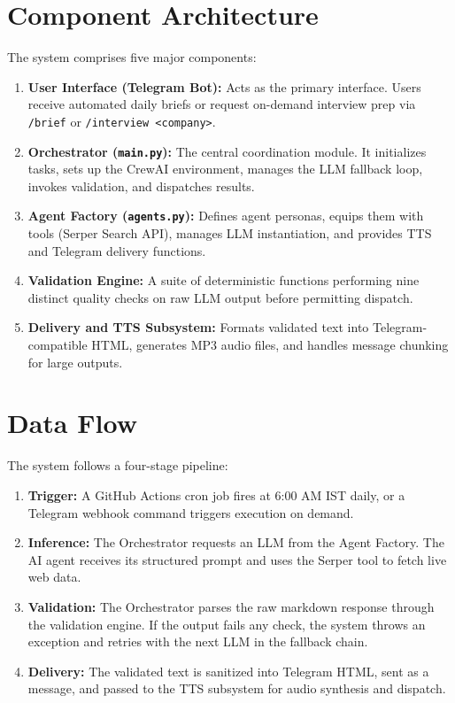 \documentclass[12pt,a4paper]{report}
\begin{document}
\section{Component Architecture}
The system comprises five major components:
\begin{enumerate}
    \item \textbf{User Interface (Telegram Bot):} Acts as the primary interface. Users receive automated daily briefs or request on-demand interview prep via \texttt{/brief} or \texttt{/interview <company>}.
    \item \textbf{Orchestrator (\texttt{main.py}):} The central coordination module. It initializes tasks, sets up the CrewAI environment, manages the LLM fallback loop, invokes validation, and dispatches results.
    \item \textbf{Agent Factory (\texttt{agents.py}):} Defines agent personas, equips them with tools (Serper Search API), manages LLM instantiation, and provides TTS and Telegram delivery functions.
    \item \textbf{Validation Engine:} A suite of deterministic functions performing nine distinct quality checks on raw LLM output before permitting dispatch.
    \item \textbf{Delivery and TTS Subsystem:} Formats validated text into Telegram-compatible HTML, generates MP3 audio files, and handles message chunking for large outputs.
\end{enumerate}

\section{Data Flow}
The system follows a four-stage pipeline:
\begin{enumerate}
    \item \textbf{Trigger:} A GitHub Actions cron job fires at 6:00 AM IST daily, or a Telegram webhook command triggers execution on demand.
    \item \textbf{Inference:} The Orchestrator requests an LLM from the Agent Factory. The AI agent receives its structured prompt and uses the Serper tool to fetch live web data.
    \item \textbf{Validation:} The Orchestrator parses the raw markdown response through the validation engine. If the output fails any check, the system throws an exception and retries with the next LLM in the fallback chain.
    \item \textbf{Delivery:} The validated text is sanitized into Telegram HTML, sent as a message, and passed to the TTS subsystem for audio synthesis and dispatch.
\end{enumerate}
\end{document}
